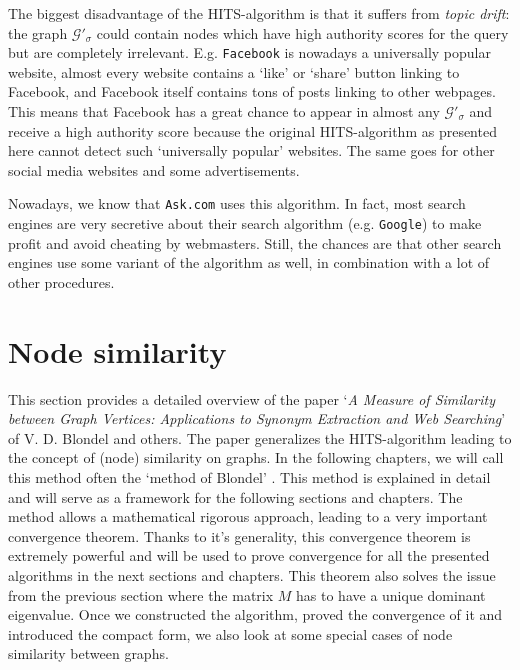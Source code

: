 \documentclass[a4paper,11pt]{report}
\newcommand{\graf}{\mathscr{G}}
\begin{document}
The biggest 
disadvantage of the HITS-algorithm is that it suffers from \emph{topic drift}: 
the graph $\graf'_\sigma$ could contain nodes which have high authority scores 
for the query but are completely irrelevant.  E.g. \texttt{Facebook} is nowadays a universally popular website, 
almost every website 
 contains a `like' or `share' button linking to Facebook, and Facebook itself contains tons of posts
 linking to other webpages. This means that Facebook has a great chance to appear in almost any
  $\graf'_\sigma$ and receive a high
 authority score because the original HITS-algorithm as presented here cannot detect such `universally popular' websites.  The same goes for other social media websites and some advertisements.

Nowadays, we know that \texttt{Ask.com} uses this algorithm. In fact, most search engines are 
very secretive about their search algorithm (e.g. \texttt{Google}) to make profit and avoid cheating by webmasters. Still, the chances 
are that other search engines use some variant of the algorithm as well, in 
combination with a lot of other procedures. 
\newpage
\section{Node similarity}\label{sectionnodesim}
This section provides a detailed overview of the paper `\emph{A Measure of Similarity between Graph Vertices: 
Applications to Synonym Extraction and Web Searching}' \cite{blondel} of V. D. Blondel and others. 
The paper generalizes the HITS-algorithm leading to the concept of (node) similarity on  
graphs. In the following chapters, we will call this method often the `method of Blondel' . This method is explained in detail and will serve as a framework for the following sections and chapters. The method allows
a mathematical rigorous approach, leading to a very important convergence theorem. Thanks to it's generality, this convergence theorem is extremely powerful
and will be used
to prove convergence for all the presented algorithms in the next sections and chapters.  This theorem also solves 
the issue from the previous section where the matrix $M$ has to have a unique dominant
eigenvalue. Once we constructed the algorithm, proved the convergence of it and 
introduced the compact form, we also look at some special cases of node similarity 
between graphs.
\end{document}
